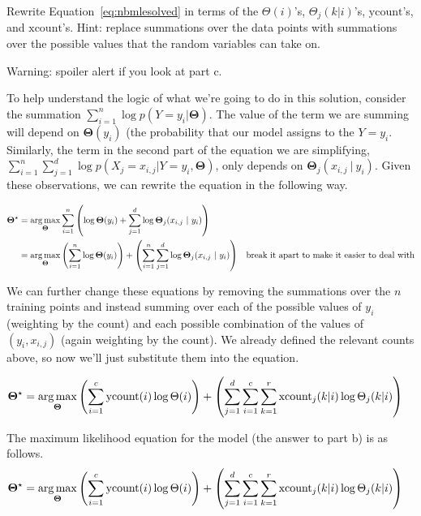 \documentclass[assignment04_Solutions]{subfiles}
\begin{document}
\begin{exercise}[(60 minutes)]
Rewrite Equation~\ref{eq:nbmlesolved} in terms of the $\Theta(i)$'s, $\Theta_{j}(k|i)$'s, $\mbox{ycount}$'s, and $\mbox{xcount}$'s.  Hint: replace summations over the data points with summations over the possible values that the random variables can take on.

Warning: spoiler alert if you look at part c.
\begin{boxedsolution}
To help understand the logic of what we're going to do in this solution, consider the summation $\sum_{i=1}^n  \log p(Y = y_i  | \mathbf{\Theta})$.  The value of the term we are summing will depend on $\mathbf{\Theta}(y_i)$ (the probability that our model assigns to the $Y=y_i$.  Similarly, the term in the second part of the equation we are simplifying,  $\sum_{i=1}^n  \sum_{j=1}^d \log p(X_j = x_{i,j} | Y = y_i,  \mathbf{\Theta})$, only depends on $\mathbf{\Theta}_j(x_{i,j}~|~y_i)$.  Given these observations, we can rewrite the equation in the following way.

\begin{align}
\mathbf{\Theta^\star} &= \operatorname*{arg\,max}_{\mathbf{\Theta}} \sum_{i=1}^n  \left ( \log  \mathbf{\Theta}(y_i)  + \sum_{j=1}^d \log \mathbf{\Theta}_j(x_{i,j}~|~y_i) \right ) \nonumber \\
&=  \operatorname*{arg\,max}_{\mathbf{\Theta}} \left ( \sum_{i=1}^n \log  \mathbf{\Theta}(y_i) \right) + \left ( \sum_{i=1}^n  \sum_{j=1}^d \log \mathbf{\Theta}_j(x_{i,j}~|~y_i) \right)  &\mbox{break it apart to make it easier to deal with} \nonumber
\end{align}

We can further change these equations by removing the summations over the $n$ training points and instead summing over each of the possible values of $y_i$ (weighting by the count) and each possible combination of the values of $(y_i, x_{i,j})$ (again weighting by the count). We already defined the relevant counts above, so now we'll just substitute them into the equation.

\begin{align}
\mathbf{\Theta}^\star &= \operatorname*{arg\,max}_{\mathbf{\Theta}} \left ( \sum_{i=1}^c \mbox{ycount}(i) \log \Theta(i)  \right) +  \left ( \sum_{j=1}^d \sum_{i=1}^c \sum_{k=1}^r \mbox{xcount}_j(k|i) \log \Theta_j(k|i) \right )
\end{align}
\end{boxedsolution}

\item The maximum likelihood equation for the model (the answer to part b) is as follows.
\begin{align}
\mathbf{\Theta}^\star &= \operatorname*{arg\,max}_{\mathbf{\Theta}} \left ( \sum_{i=1}^c \mbox{ycount}(i) \log \Theta(i)  \right) +  \left ( \sum_{j=1}^d \sum_{i=1}^c \sum_{k=1}^r \mbox{xcount}_j(k|i) \log \Theta_j(k|i) \right ) \label{eq:mleparameterized}
\end{align}


\end{exercise}
\end{document}
